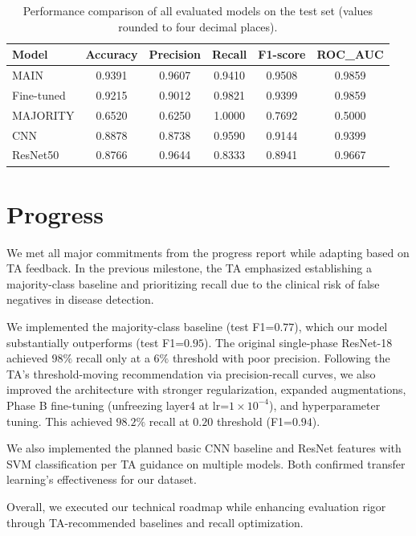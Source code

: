 \documentclass[11pt]{article}
\begin{document}
\begin{table}[h]
\centering
\scriptsize %
\begin{tabular}{lccccc}
\hline
\textbf{Model} & \textbf{Accuracy} & \textbf{Precision} & \textbf{Recall} & \textbf{F1-score} & \textbf{ROC\_AUC} \\
\hline
MAIN           & 0.9391 & 0.9607 & 0.9410 & 0.9508 & 0.9859 \\
Fine-tuned  & 0.9215 & 0.9012 & 0.9821 & 0.9399 & 0.9859 \\
MAJORITY                   & 0.6520 & 0.6250 & 1.0000 & 0.7692 & 0.5000 \\
CNN                        & 0.8878 & 0.8738 & 0.9590 & 0.9144 & 0.9399 \\
ResNet50                   & 0.8766 & 0.9644 & 0.8333 & 0.8941 & 0.9667 \\
\hline
\end{tabular}
\caption{Performance comparison of all evaluated models on the test set (values rounded to four decimal places).}
\label{tab:model_performance}
\end{table}

\section{Progress}
We met all major commitments from the progress report while adapting based on TA feedback. In the previous milestone, the TA emphasized establishing a majority-class baseline and prioritizing recall due to the clinical risk of false negatives in disease detection.

We implemented the majority-class baseline (test F1=$0.77$), which our model substantially outperforms (test F1=$0.95$). The original single-phase ResNet-18 achieved $98\%$ recall only at a $6\%$ threshold with poor precision. Following the TA's threshold-moving recommendation via precision-recall curves, we also improved the architecture with stronger regularization, expanded augmentations, Phase B fine-tuning (unfreezing layer4 at lr=$1 \times 10^{-4}$), and hyperparameter tuning. This achieved $98.2\%$ recall at $0.20$ threshold (F1=$0.94$).

We also implemented the planned basic CNN baseline and ResNet features with SVM classification per TA guidance on multiple models. Both confirmed transfer learning's effectiveness for our dataset.

Overall, we executed our technical roadmap while enhancing evaluation rigor through TA-recommended baselines and recall optimization.
\end{document}
